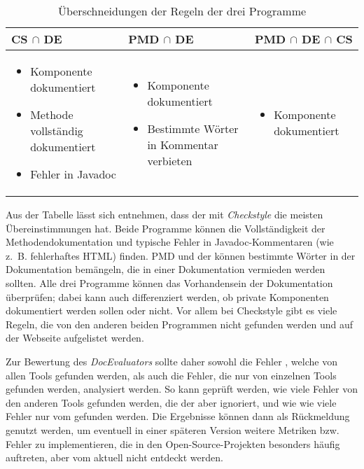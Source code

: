 \begin{table}[]
    \centering
    \begin{tabular}{m{4.5cm}|m{4.5cm}|m{4.5cm}}
     \textbf{CS} $\cap$ \textbf{DE}  & \textbf{PMD} $\cap$ \textbf{DE} & \textbf{PMD} $\cap$ \textbf{DE} $\cap$  \textbf{CS}  \\\hline
     \begin{itemize}
        \item Komponente dokumentiert
        \item Methode vollständig dokumentiert
         \item Fehler in Javadoc
     \end{itemize}
      & 
      \begin{itemize}
          \item Komponente dokumentiert
          \item Bestimmte Wörter in Kommentar verbieten
      \end{itemize}
      & 
       \begin{itemize}
          \item Komponente dokumentiert
         
      \end{itemize}
      \\\hline
    \end{tabular}
    \caption{Überschneidungen der Regeln der drei Programme}
    \label{tab:inters_rules}
\end{table}

Aus der Tabelle lässt sich entnehmen, dass der \doceval mit \textit{Checkstyle} die meisten Übereinstimmungen hat. Beide Programme können die Vollständigkeit der Methodendokumentation und typische Fehler in Javadoc-Kommentaren (wie z.~B. fehlerhaftes HTML) finden. PMD und der \doceval können bestimmte Wörter in der Dokumentation bemängeln, die in einer Dokumentation vermieden werden sollten. Alle drei Programme können das Vorhandensein der Dokumentation überprüfen; dabei kann auch differenziert werden, ob private Komponenten dokumentiert werden sollen oder nicht. Vor allem bei Checkstyle gibt es viele Regeln, die von den anderen beiden Programmen nicht gefunden werden und auf der Webseite \cite{checkstyle_doc_metrics} aufgelistet werden.

Zur Bewertung des \textit{DocEvaluators} sollte daher sowohl die Fehler , welche von allen Tools gefunden werden, als auch die Fehler, die nur von einzelnen Tools gefunden werden, analysiert werden. So kann  geprüft werden, wie viele Fehler von den anderen Tools gefunden werden, die der \doceval aber ignoriert, und wie wie viele Fehler nur vom \doceval gefunden werden. Die Ergebnisse können dann als Rückmeldung genutzt werden, um  eventuell in einer späteren Version weitere Metriken bzw. Fehler zu implementieren, die in den Open-Source-Projekten besonders häufig auftreten, aber vom \doceval aktuell nicht entdeckt werden. 

